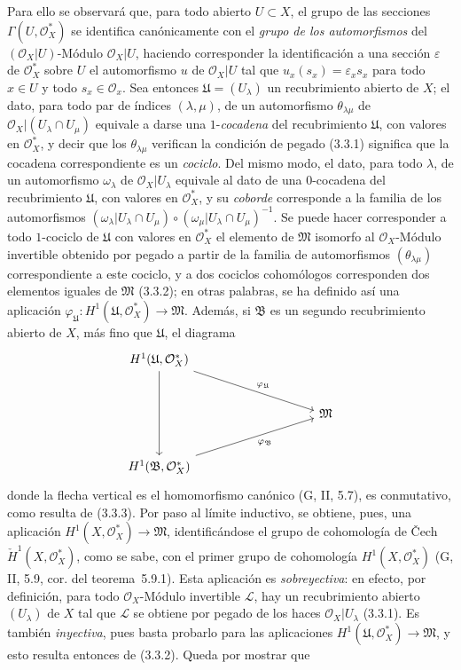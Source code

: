\begin{env}[5.4.7]
Para ello se observará que, para todo abierto $U\subset X$, el grupo de las secciones
$\Gamma(U,\mathcal{O}_X^*)$ se identifica canónicamente con el \emph{grupo de los
automorfismos} del $(\mathcal{O}_X|U)$-Módulo $\mathcal{O}_X|U$,
haciendo corresponder la identificación a una sección $\varepsilon$ de
$\mathcal{O}_X^*$ sobre $U$ el automorfismo $u$ de $\mathcal{O}_X|U$
tal que $u_x(s_x)=\varepsilon_xs_x$ para todo $x\in U$ y todo
$s_x\in\mathcal{O}_x$. Sea entonces $\mathfrak{U}=(U_\lambda)$ un recubrimiento
abierto de $X$; el dato, para todo par de índices $(\lambda,\mu)$, de un
automorfismo $\theta_{\lambda\mu}$ de
$\mathcal{O}_X|(U_\lambda\cap U_\mu)$ equivale a darse una
$1$-\emph{cocadena} del recubrimiento $\mathfrak{U}$, con valores en
$\mathcal{O}_X^*$, y decir que los $\theta_{\lambda\mu}$ verifican la
condición de pegado (3.3.1) significa que la cocadena correspondiente es
un \emph{cociclo}. Del mismo modo, el dato, para todo $\lambda$, de un automorfismo
$\omega_\lambda$ de $\mathcal{O}_X|U_\lambda$ equivale al dato de una
$0$-cocadena del recubrimiento $\mathfrak{U}$, con valores en
$\mathcal{O}_X^*$, y su \emph{coborde} corresponde a la familia de los
automorfismos
$(\omega_\lambda|U_\lambda\cap U_\mu)\circ
 (\omega_\mu|U_\lambda\cap U_\mu)^{-1}$.
Se puede hacer corresponder a todo $1$-cociclo de $\mathfrak{U}$ con valores
en $\mathcal{O}_X^*$ el elemento de $\mathfrak{M}$ isomorfo al
$\mathcal{O}_X$-Módulo invertible obtenido por pegado a partir de la
familia de automorfismos $(\theta_{\lambda\mu})$ correspondiente a este cociclo,
y a dos cociclos cohomólogos corresponden dos elementos iguales de
$\mathfrak{M}$ (3.3.2); en otras palabras, se ha definido así una aplicación
$\varphi_{\mathfrak{U}}:H^1(\mathfrak{U},\mathcal{O}_X^*)\to\mathfrak{M}$.
Además, si $\mathfrak{B}$ es un segundo recubrimiento abierto de $X$, más fino
que $\mathfrak{U}$, el diagrama
\[
\begin{tikzcd}[column sep=huge,row sep=large]
H^1(\mathfrak{U},\mathcal{O}_X^*)
  \arrow[dd]
  \arrow[rrd,"\varphi_{\mathfrak{U}}"] & & \\
& & \mathfrak{M} \\
H^1(\mathfrak{B},\mathcal{O}_X^*)
  \arrow[rru,swap,"\varphi_{\mathfrak{B}}"] & &
\end{tikzcd}
\]
donde la flecha vertical es el homomorfismo canónico (G, II, 5.7), es
conmutativo, como resulta de (3.3.3). Por paso al límite inductivo, se
obtiene, pues, una aplicación
$H^1(X,\mathcal{O}_X^*)\to\mathfrak{M}$, identificándose el grupo de cohomología de \v{C}ech
$\check{H}^1(X,\mathcal{O}_X^*)$, como se sabe, con el primer grupo
de cohomología $H^1(X,\mathcal{O}_X^*)$ (G, II, 5.9, cor. del teorema~5.9.1).
Esta aplicación es \emph{sobreyectiva}: en efecto, por definición, para todo
$\mathcal{O}_X$-Módulo invertible $\mathcal{L}$, hay un recubrimiento abierto
$(U_\lambda)$ de $X$ tal que $\mathcal{L}$ se obtiene por pegado de los
haces $\mathcal{O}_X|U_\lambda$ (3.3.1). Es también
\emph{inyectiva}, pues basta probarlo para las aplicaciones
$H^1(\mathfrak{U},\mathcal{O}_X^*)\to\mathfrak{M}$, y esto resulta entonces de
(3.3.2). Queda por mostrar que


\end{env}
